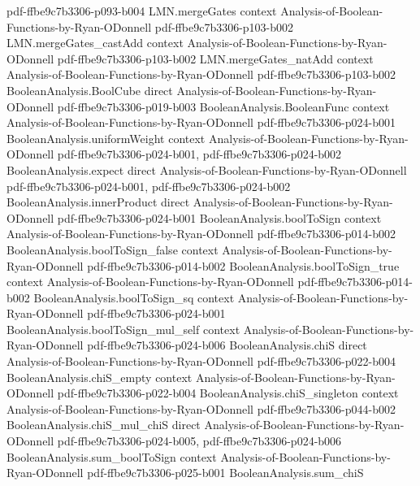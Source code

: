 \begin{lemma}
  {pdf-ffbe9c7b3306-p093-b004}
\proofstep
  {LMN.mergeGates}
  {context}
  {Analysis-of-Boolean-Functions-by-Ryan-ODonnell}
  {pdf-ffbe9c7b3306-p103-b002}
\proofstep
  {LMN.mergeGates_castAdd}
  {context}
  {Analysis-of-Boolean-Functions-by-Ryan-ODonnell}
  {pdf-ffbe9c7b3306-p103-b002}
\proofstep
  {LMN.mergeGates_natAdd}
  {context}
  {Analysis-of-Boolean-Functions-by-Ryan-ODonnell}
  {pdf-ffbe9c7b3306-p103-b002}
\proofstep
  {BooleanAnalysis.BoolCube}
  {direct}
  {Analysis-of-Boolean-Functions-by-Ryan-ODonnell}
  {pdf-ffbe9c7b3306-p019-b003}
\proofstep
  {BooleanAnalysis.BooleanFunc}
  {context}
  {Analysis-of-Boolean-Functions-by-Ryan-ODonnell}
  {pdf-ffbe9c7b3306-p024-b001}
\proofstep
  {BooleanAnalysis.uniformWeight}
  {context}
  {Analysis-of-Boolean-Functions-by-Ryan-ODonnell}
  {pdf-ffbe9c7b3306-p024-b001,
    pdf-ffbe9c7b3306-p024-b002}
\proofstep
  {BooleanAnalysis.expect}
  {direct}
  {Analysis-of-Boolean-Functions-by-Ryan-ODonnell}
  {pdf-ffbe9c7b3306-p024-b001,
    pdf-ffbe9c7b3306-p024-b002}
\proofstep
  {BooleanAnalysis.innerProduct}
  {direct}
  {Analysis-of-Boolean-Functions-by-Ryan-ODonnell}
  {pdf-ffbe9c7b3306-p024-b001}
\proofstep
  {BooleanAnalysis.boolToSign}
  {context}
  {Analysis-of-Boolean-Functions-by-Ryan-ODonnell}
  {pdf-ffbe9c7b3306-p014-b002}
\proofstep
  {BooleanAnalysis.boolToSign_false}
  {context}
  {Analysis-of-Boolean-Functions-by-Ryan-ODonnell}
  {pdf-ffbe9c7b3306-p014-b002}
\proofstep
  {BooleanAnalysis.boolToSign_true}
  {context}
  {Analysis-of-Boolean-Functions-by-Ryan-ODonnell}
  {pdf-ffbe9c7b3306-p014-b002}
\proofstep
  {BooleanAnalysis.boolToSign_sq}
  {context}
  {Analysis-of-Boolean-Functions-by-Ryan-ODonnell}
  {pdf-ffbe9c7b3306-p024-b001}
\proofstep
  {BooleanAnalysis.boolToSign_mul_self}
  {context}
  {Analysis-of-Boolean-Functions-by-Ryan-ODonnell}
  {pdf-ffbe9c7b3306-p024-b006}
\proofstep
  {BooleanAnalysis.chiS}
  {direct}
  {Analysis-of-Boolean-Functions-by-Ryan-ODonnell}
  {pdf-ffbe9c7b3306-p022-b004}
\proofstep
  {BooleanAnalysis.chiS_empty}
  {context}
  {Analysis-of-Boolean-Functions-by-Ryan-ODonnell}
  {pdf-ffbe9c7b3306-p022-b004}
\proofstep
  {BooleanAnalysis.chiS_singleton}
  {context}
  {Analysis-of-Boolean-Functions-by-Ryan-ODonnell}
  {pdf-ffbe9c7b3306-p044-b002}
\proofstep
  {BooleanAnalysis.chiS_mul_chiS}
  {direct}
  {Analysis-of-Boolean-Functions-by-Ryan-ODonnell}
  {pdf-ffbe9c7b3306-p024-b005,
    pdf-ffbe9c7b3306-p024-b006}
\proofstep
  {BooleanAnalysis.sum_boolToSign}
  {context}
  {Analysis-of-Boolean-Functions-by-Ryan-ODonnell}
  {pdf-ffbe9c7b3306-p025-b001}
\proofstep
  {BooleanAnalysis.sum_chiS}

\end{lemma}
